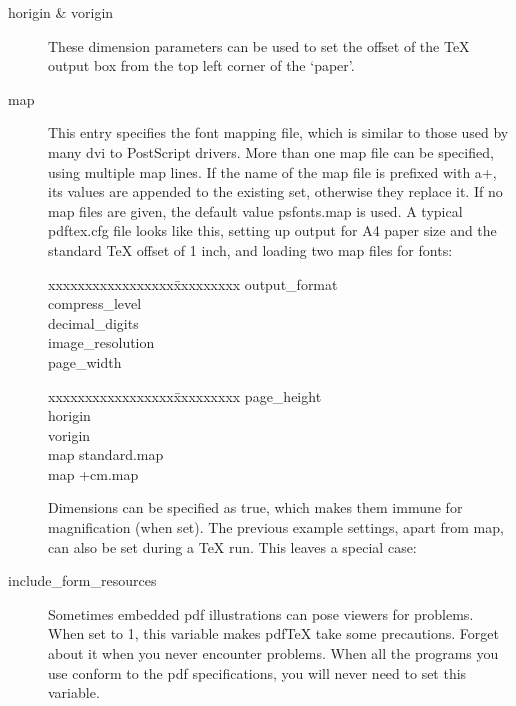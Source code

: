 \documentclass{article}
\begin{document}
\begin{description}
\item[horigin \& vorigin] These dimension parameters can be used to
set the offset of the \TeX{} output box from the top left corner of the
`paper'.

\item[map] This entry specifies the font mapping file, which is similar
to those used by many dvi to PostScript drivers. More than one map
file can be specified, using multiple map lines. If the name of the
map file is prefixed with a+, its values are appended to the existing
set, otherwise they replace it. If no map files are given, the default
value psfonts.map is used. A typical pdftex.cfg file looks like this,
setting up output for A4 paper size and the standard \TeX{} offset of
1 inch, and loading two map files for fonts:

\begin{small}
\begin{tabbing}
xxxxxxxxxxxxxxxxx\=xxxxxxxxx\kill
output\_format\\
compress\_level \\
decimal\_digits \\
image\_resolution\\
page\_width \>210mm\\
\end{tabbing}

\vfill\eject


\begin{tabbing}
xxxxxxxxxxxxxxxxx\=xxxxxxxxx\kill
page\_height\> 297mm\\
horigin\> 1in\\
vorigin \>1in\\
map \>standard.map\\
map \>+cm.map
\end{tabbing}
\end{small}

Dimensions can be specified as true, which makes them immune for
magnification (when set). The previous example settings, apart from
map, can also be set during a \TeX{} run. This leaves a special case:

\item[include\_form\_resources] Sometimes embedded pdf illustrations
can pose viewers for problems. When set to 1, this variable makes
pdf\TeX{} take some precautions. Forget about it when you never
encounter problems. When all the programs you use conform to the
pdf specifications, you will never need to set this variable.
\end{description}
\end{document}
